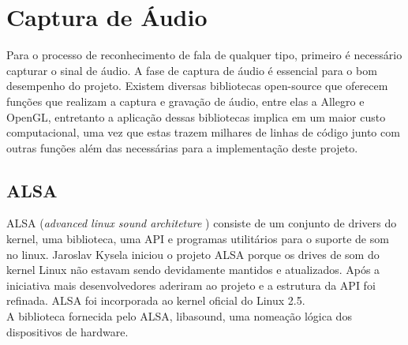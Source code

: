 \chapter{Captura de Áudio}
\quad Para o processo de reconhecimento de fala de qualquer tipo, primeiro é necessário capturar o sinal de áudio. A fase de captura de áudio é essencial para o bom desempenho do projeto. Existem diversas bibliotecas open-source que oferecem funções que realizam a captura e gravação de áudio, entre elas a Allegro e OpenGL, entretanto a aplicação dessas bibliotecas implica em um maior custo computacional, uma vez que estas trazem milhares de linhas de código junto com outras funções além das necessárias para a implementação deste projeto. 
\section{ALSA}

\quad ALSA (\textit{advanced linux sound architeture }) consiste de um conjunto de drivers do kernel, uma biblioteca, uma API e programas utilitários para o suporte de som no linux. Jaroslav Kysela iniciou o projeto ALSA porque os drives de som do kernel Linux não estavam sendo devidamente mantidos e atualizados. Após  a iniciativa mais desenvolvedores aderiram ao projeto e a estrutura da API foi refinada. ALSA foi incorporada ao kernel oficial do Linux 2.5.\\
A biblioteca fornecida pelo ALSA, libasound, uma nomeação lógica dos dispositivos de hardware.